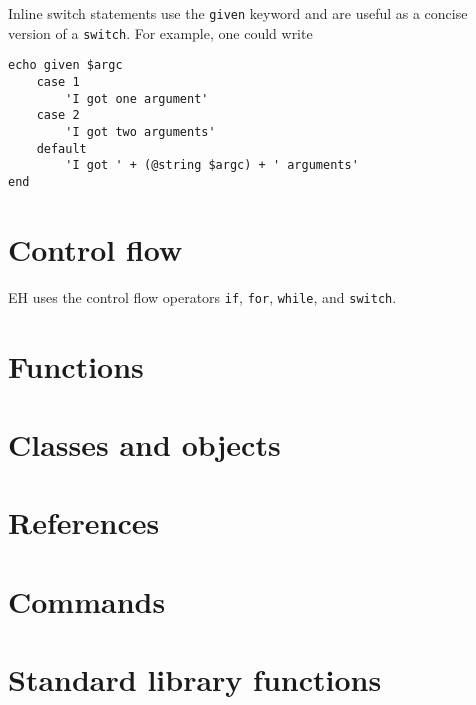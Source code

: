 \documentclass{article}
\begin{document}
Inline switch statements use the \verb#given# keyword and are useful as a concise version of a \verb#switch#. 
For example, one could write
\begin{verbatim}
echo given $argc
	case 1
		'I got one argument'
	case 2
		'I got two arguments'
	default
		'I got ' + (@string $argc) + ' arguments'
end
\end{verbatim}

\section{Control flow}
EH uses the control flow operators \verb#if#, \verb#for#, \verb#while#, and \verb#switch#. 
\section{Functions}

\section{Classes and objects}

\section{References}

\section{Commands}

\section{Standard library functions}
\end{document}

